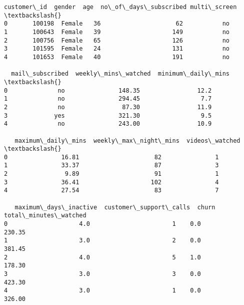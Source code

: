 \documentclass[11pt]{article}
\begin{document}
    \begin{Verbatim}[commandchars=\\\{\}]
   customer\_id  gender  age  no\_of\_days\_subscribed multi\_screen  \textbackslash{}
0       100198  Female   36                     62           no
1       100643  Female   39                    149           no
2       100756  Female   65                    126           no
3       101595  Female   24                    131           no
4       101653  Female   40                    191           no

  mail\_subscribed  weekly\_mins\_watched  minimum\_daily\_mins  \textbackslash{}
0              no               148.35                12.2
1              no               294.45                 7.7
2              no                87.30                11.9
3             yes               321.30                 9.5
4              no               243.00                10.9

   maximum\_daily\_mins  weekly\_max\_night\_mins  videos\_watched  \textbackslash{}
0               16.81                     82               1
1               33.37                     87               3
2                9.89                     91               1
3               36.41                    102               4
4               27.54                     83               7

   maximum\_days\_inactive  customer\_support\_calls  churn  total\_minutes\_watched
0                    4.0                       1    0.0                 230.35
1                    3.0                       2    0.0                 381.45
2                    4.0                       5    1.0                 178.30
3                    3.0                       3    0.0                 423.30
4                    3.0                       1    0.0                 326.00
    \end{Verbatim}
\end{document}
